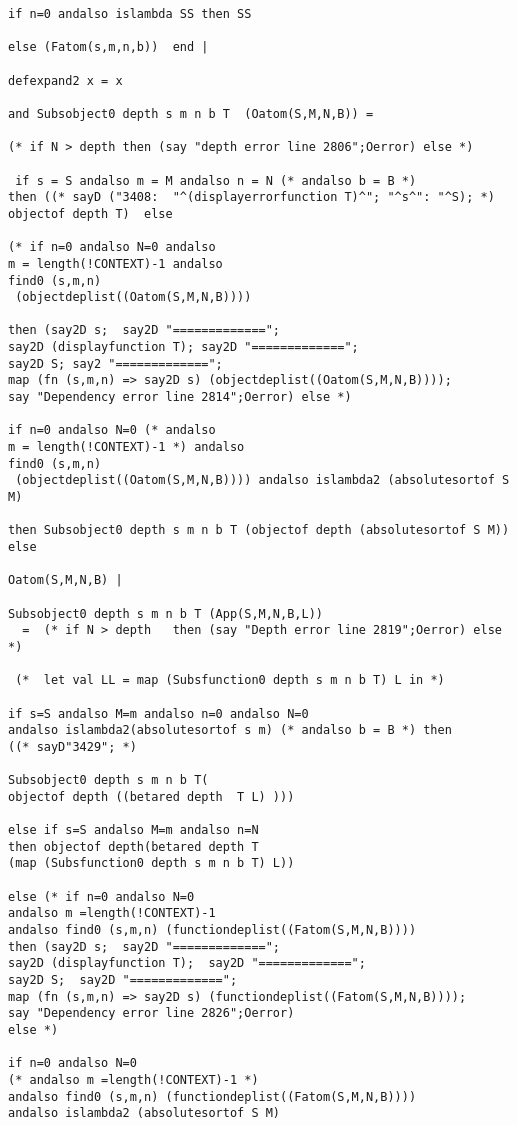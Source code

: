 \documentclass[12pt]{article}
\begin{document}
\begin{verbatim}
if n=0 andalso islambda SS then SS

else (Fatom(s,m,n,b))  end |

defexpand2 x = x

and Subsobject0 depth s m n b T  (Oatom(S,M,N,B)) =

(* if N > depth then (say "depth error line 2806";Oerror) else *)

 if s = S andalso m = M andalso n = N (* andalso b = B *)
then ((* sayD ("3408:  "^(displayerrorfunction T)^"; "^s^": "^S); *) objectof depth T)  else 

(* if n=0 andalso N=0 andalso 
m = length(!CONTEXT)-1 andalso
find0 (s,m,n)
 (objectdeplist((Oatom(S,M,N,B))))
 
then (say2D s;  say2D "=============";
say2D (displayfunction T); say2D "=============";
say2D S; say2 "=============";
map (fn (s,m,n) => say2D s) (objectdeplist((Oatom(S,M,N,B))));
say "Dependency error line 2814";Oerror) else *)

if n=0 andalso N=0 (* andalso 
m = length(!CONTEXT)-1 *) andalso
find0 (s,m,n)
 (objectdeplist((Oatom(S,M,N,B)))) andalso islambda2 (absolutesortof S M)
 
then Subsobject0 depth s m n b T (objectof depth (absolutesortof S M)) else

Oatom(S,M,N,B) |

Subsobject0 depth s m n b T (App(S,M,N,B,L)) 
  =  (* if N > depth   then (say "Depth error line 2819";Oerror) else *)
  
 (*  let val LL = map (Subsfunction0 depth s m n b T) L in *)

if s=S andalso M=m andalso n=0 andalso N=0  
andalso islambda2(absolutesortof s m) (* andalso b = B *) then 
((* sayD"3429"; *)

Subsobject0 depth s m n b T(
objectof depth ((betared depth  T L) )))

else if s=S andalso M=m andalso n=N  
then objectof depth(betared depth T 
(map (Subsfunction0 depth s m n b T) L))

else (* if n=0 andalso N=0 
andalso m =length(!CONTEXT)-1
andalso find0 (s,m,n) (functiondeplist((Fatom(S,M,N,B))))
then (say2D s;  say2D "=============";
say2D (displayfunction T);  say2D "=============";
say2D S;  say2D "=============";
map (fn (s,m,n) => say2D s) (functiondeplist((Fatom(S,M,N,B))));
say "Dependency error line 2826";Oerror)
else *) 

if n=0 andalso N=0 
(* andalso m =length(!CONTEXT)-1 *)
andalso find0 (s,m,n) (functiondeplist((Fatom(S,M,N,B)))) 
andalso islambda2 (absolutesortof S M)


\end{verbatim}
\end{document}
